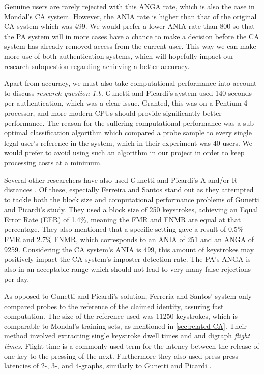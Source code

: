 \documentclass[informationsecurity]{gucmasterproject}
\begin{document}
Genuine users are rarely rejected with this ANGA rate, which is also the case in Mondal's \cite{mondal} CA system.
However, the ANIA rate is higher than that of the original CA system which was 499.
We would prefer a lower ANIA rate than 800 so that the PA system will in more cases have a chance to make a decision before the CA system has already removed access from the current user.
This way we can make more use of both authentication systems, which will hopefully impact our research subquestion regarding achieving a better accuracy.

Apart from accuracy, we must also take computational performance into account to discuss \textit{research question 1.b}.
Gunetti and Picardi's \cite{gnp} system used 140 seconds per authentication, which was a clear issue.
Granted, this was on a Pentium 4 processor, and more modern CPUs should provide significantly better performance.
The reason for the suffering computational performance was a sub-optimal classification algorithm which compared a probe sample to every single legal user's reference in the system, which in their experiment was 40 users.
We would prefer to avoid using such an algorithm in our project in order to keep processing costs at a minimum.

Several other researchers have also used Gunetti and Picardi's A and/or R distances \cite{Kolakowska2011, Messerman, meaningless, hu, davoudi2009, davoudi2010, superResults, Pinto2014, sliding}.
Of these, especially Ferreira and Santos \cite{superResults} stand out as they attempted to tackle both the block size and computational performance problems of Gunetti and Picardi's \cite{gnp} study.
They used a block size of 250 keystrokes, achieving an Equal Error Rate (EER) of 1.4\%, meaning the FMR and FNMR are equal at that percentage.
They also mentioned that a specific setting gave a result of 0.5\% FMR and 2.7\% FNMR, which corresponds to an ANIA of 251 and an ANGA of 9259.
Considering the CA system's ANIA is 499, this amount of keystrokes may positively impact the CA system's imposter detection rate.
The PA's ANGA is also in an acceptable range which should not lead to very many false rejections per day.

As opposed to Gunetti and Picardi's solution, Ferreria and Santos' system only compared probes to the reference of the claimed identity, assuring fast computation.
The size of the reference used was 11250 keystrokes, which is comparable to Mondal's training sets, as mentioned in \cref{sec:related-CA}.
Their method involved extracting single keystroke dwell times and and digraph \textit{flight times}.
Flight time is a commonly used term for the latency between the release of one key to the pressing of the next.
Furthermore they also used press-press latencies of 2-, 3-, and 4-graphs, similarly to Gunetti and Picardi \cite{gnp}.
\end{document}
